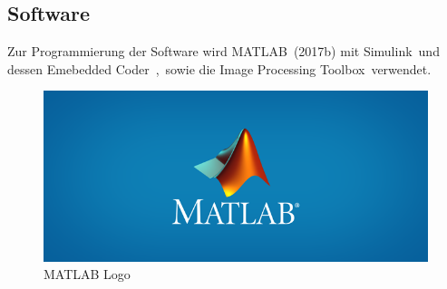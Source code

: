 \subsection{Software}
Zur Programmierung der Software wird MATLAB\textregistered\ (2017b) mit Simulink\textregistered\ und dessen Emebedded Coder\texttrademark\ ,\ sowie die Image Processing Toolbox\texttrademark\ verwendet.


\begin{figure}[hb]
	\centering
	\includegraphics[scale=0.5]{bilder/MATLABLogo.png}
	\caption{MATLAB Logo}
	\label{fig:MATLAB}
\end{figure}




